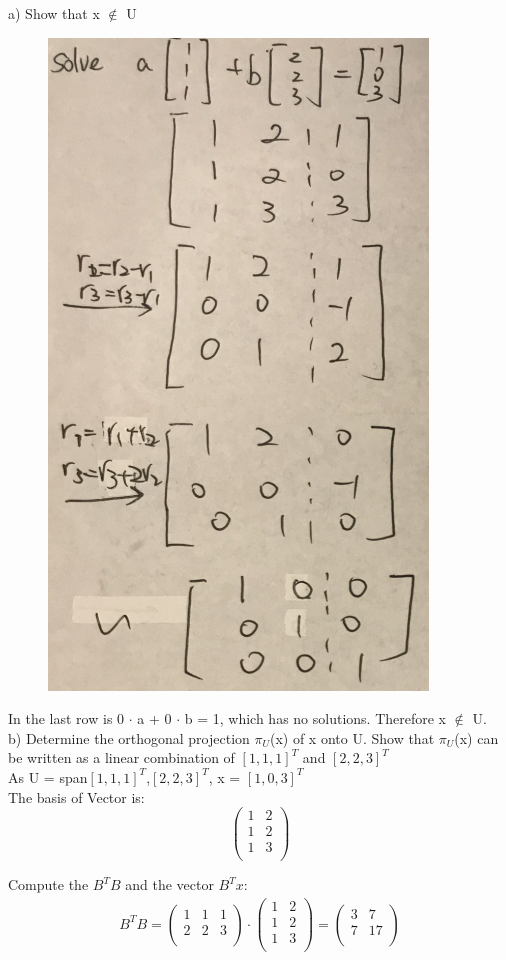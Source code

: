 \documentclass{article}
\begin{document}
a) Show that x $\notin$ U\\
\begin{figure}[H]
\centering
  \includegraphics[width = 0.55\linewidth] {7b.png}
\end{figure}

In the last row is 0 $\cdot$ a + 0 $\cdot$ b = 1, which has no solutions. Therefore x $\notin$ U.\\

b) Determine the orthogonal projection $\pi_{U}$(x) of x onto U. Show that $\pi_U$(x) can be written as a linear combination of $[1, 1, 1]^T$ and $[2, 2, 3]^T$\\

As U = span{$[1, 1, 1]^T$,$[2,2,3]^T$}, x = $[1,0,3]^T$\\
The basis of Vector is:
\begin{equation*}
\begin{pmatrix}
1 & 2\\
1 & 2\\
1 & 3\\
\end{pmatrix}
\end{equation*}

Compute the $B^TB$ and the vector $B^Tx$:\\
\begin{gather}
B^TB = \begin{pmatrix}
1 & 1 & 1\\
2 & 2 & 3\\
\end{pmatrix} \cdot \begin{pmatrix}
1 & 2\\
1 & 2\\
1 & 3\\
\end{pmatrix} = \begin{pmatrix}
3 & 7\\
7 & 17\\
\end{pmatrix}
\end{gather}
\end{document}
